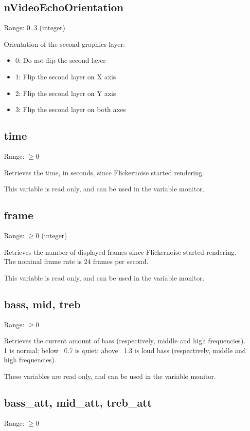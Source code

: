 \documentclass[11pt, a5paper, pagesize]{scrbook}
\begin{document}
\subsection{nVideoEchoOrientation}
Range: $0..3$ (integer)

Orientation of the second graphics layer:
\begin{itemize}
\item 0: Do not flip the second layer
\item 1: Flip the second layer on X axis
\item 2: Flip the second layer on Y axis
\item 3: Flip the second layer on both axes
\end{itemize}

\subsection{time}
Range: $\geq 0$

Retrieves the time, in seconds, since Flickernoise started rendering.

This variable is read only, and can be used in the variable monitor.

\subsection{frame}
Range: $\geq 0$ (integer)

Retrieves the number of displayed frames since Flickernoise started rendering. The nominal frame rate is 24 frames per second.

This variable is read only, and can be used in the variable monitor.

\subsection{bass, mid, treb}
Range: $\geq 0$

Retrieves the current amount of bass (respectively, middle and high frequencies). 1 is normal; below ~0.7 is quiet; above ~1.3 is loud bass (respectively, middle and high frequencies).

These variables are read only, and can be used in the variable monitor.

\subsection{bass\_att, mid\_att, treb\_att}
Range: $\geq 0$
\end{document}
